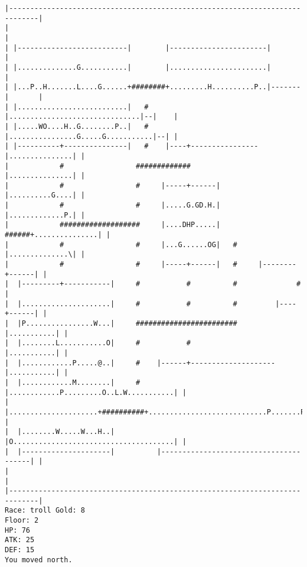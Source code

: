 \documentclass[11pt]{article}
\theoremstyle{plain}
\begin{document}
\begin{Verbatim}[fontsize=\scriptsize]
|-----------------------------------------------------------------------------|
|                                                                             |
| |--------------------------|        |-----------------------|               |
| |..............G...........|        |.......................|               |
| |...P..H.......L....G......+########+.........H..........P..|-------|       |
| |..........................|   #    |...............................|--|    |
| |.....WO....H..G........P..|   #    |................G.....G...........|--| |
| |----------+---------------|   #    |----+----------------|...............| |
|            #                 #############                |...............| |
|            #                 #     |-----+------|         |..........G....| |
|            #                 #     |.....G.GD.H.|         |.............P.| |
|            ###################     |....DHP.....|   ######+...............| |
|            #                 #     |...G......OG|   #     |..............\| |
|            #                 #     |-----+------|   #     |--------+------| |
|  |---------+-----------|     #           #          #              #        |
|  |.....................|     #           #          #         |----+------| |
|  |P................W...|     ########################         |...........| |
|  |........L...........O|     #           #                    |...........| |
|  |............P.....@..|     #    |------+--------------------|...........| |
|  |............M........|     #    |............P.........O..L.W...........| |
|  |.....................+##########+............................P.......P..| |
|  |........W.....W...H..|          |O......................................| |
|  |---------------------|          |---------------------------------------| |
|                                                                             |
|-----------------------------------------------------------------------------|
Race: troll Gold: 8                                                    Floor: 2
HP: 76
ATK: 25
DEF: 15
You moved north. 
\end{Verbatim}
\end{document}
